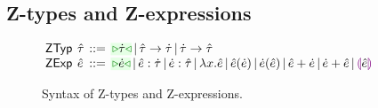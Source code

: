 \begin{subequations}


\end{subequations}
\subsection{Z-types and Z-expressions}\label{sec:cursors}
\newcommand{\cvert}{{\,{\vert}\,}}
\begin{figure}[t]
\hspace{-3px}$\arraycolsep=2pt\begin{array}{lllllll}
\mathsf{ZTyp} & \ztau & ::= &
  \zwsel{\htau} \cvert
  \tarr{\ztau}{\htau} \cvert
  \tarr{\htau}{\ztau} \\
\mathsf{ZExp} & \zexp & ::= &
  \zwsel{\hexp} \cvert
  \zexp : \htau \cvert
  \hexp : \ztau \cvert
  \hlam{x}{\zexp} \cvert
  \hap{\zexp}{\hexp} \cvert
  \hap{\hexp}{\zexp} \cvert
  \hadd{\zexp}{\hexp} \cvert
  \hadd{\hexp}{\zexp} \cvert
  \hhole{\zexp}
\end{array}$
\caption{Syntax of Z-types and Z-expressions.}
\label{fig:zexp-syntax}
\end{figure}

